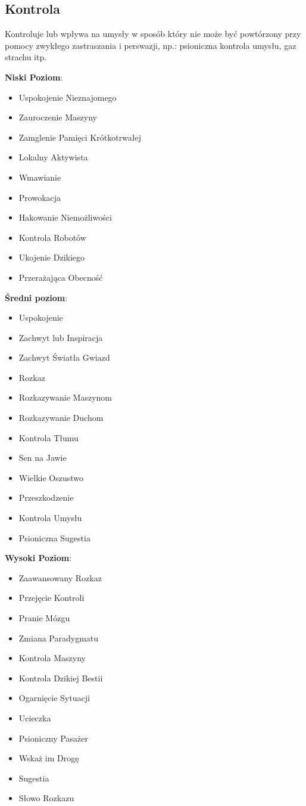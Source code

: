 \subsection{Kontrola}

Kontroluje lub wpływa na umysły w sposób który nie może być powtórzony przy pomocy zwykłego zastraszania i perswazji, np.: psioniczna kontrola umysłu, gaz strachu itp.

\textbf{Niski Poziom}:

\begin{itemize}
\item Uspokojenie Nieznajomego
\item Zauroczenie Maszyny
\item Zamglenie Pamięci Krótkotrwałej
\item Lokalny Aktywista
\item Wmawianie
\item Prowokacja
\item Hakowanie Niemożliwości
\item Kontrola Robotów
\item Ukojenie Dzikiego
\item Przerażająca Obecność
\end{itemize}

\textbf{Średni poziom}:

\begin{itemize}
\item Uspokojenie
\item Zachwyt lub Inspiracja
\item Zachwyt Światła Gwiazd
\item Rozkaz
\item Rozkazywanie Maszynom
\item Rozkazywanie Duchom
\item Kontrola Tłumu
\item Sen na Jawie
\item Wielkie Oszustwo
\item Przeszkodzenie
\item Kontrola Umysłu
\item Psioniczna Sugestia
\end{itemize}

\textbf{Wysoki Poziom}:

\begin{itemize}
\item Zaawansowany Rozkaz
\item Przejęcie Kontroli
\item Pranie Mózgu
\item Zmiana Paradygmatu
\item Kontrola Maszyny
\item Kontrola Dzikiej Bestii
\item Ogarnięcie Sytuacji
\item Ucieczka
\item Psioniczny Pasażer
\item Wskaż im Drogę
\item Sugestia
\item Słowo Rozkazu 
\end{itemize}

